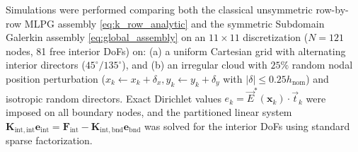 \documentclass[VANCOUVER,Times1COL]{WileyNJD-v5}
\begin{document}
Simulations were performed comparing both the classical unsymmetric row-by-row MLPG assembly \eqref{eq:k_row_analytic} and the symmetric Subdomain Galerkin assembly \eqref{eq:global_assembly} on an $11 \times 11$ discretization ($N = 121$ nodes, 81 free interior DoFs) on: (a) a uniform Cartesian grid with alternating interior directors ($45^\circ / 135^\circ$), and (b) an irregular cloud with $25\%$ random nodal position perturbation ($x_k \gets x_k + \delta_x, y_k \gets y_k + \delta_y$ with $|\delta| \le 0.25 h_{\mathrm{nom}}$) and isotropic random directors. Exact Dirichlet values $e_k = \vec{E}^*(\mathbf{x}_k) \cdot \vec{t}_k$ were imposed on all boundary nodes, and the partitioned linear system $\mathbf{K}_{\mathrm{int}, \mathrm{int}} \mathbf{e}_{\mathrm{int}} = \mathbf{F}_{\mathrm{int}} - \mathbf{K}_{\mathrm{int}, \mathrm{bnd}} \mathbf{e}_{\mathrm{bnd}}$ was solved for the interior DoFs using standard sparse factorization.
\end{document}
